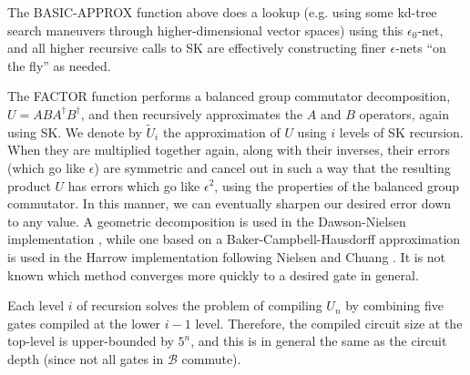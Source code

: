 The BASIC-APPROX function above does a lookup (e.g. using some kd-tree search
maneuvers through higher-dimensional vector spaces) using this $\epsilon_0$-net,
and all higher recursive calls to SK are effectively constructing
finer $\epsilon$-nets ``on the fly'' as needed.

The FACTOR function performs a balanced group commutator decomposition,
$U = ABA^\dagger B^\dagger$, and then recursively approximates the $A$ and $B$
operators, again using SK. We denote by $\tilde{U}_i$ the approximation
of $U$ using $i$ levels of SK recursion. When they are multiplied
together again, along with their inverses, their errors (which go like
$\epsilon$) are symmetric and cancel out in such a way that the resulting
product $U$ has errors which go like $\epsilon^2$, using the properties of
the balanced group commutator. In this manner, we can
eventually sharpen our desired error down to any value. A
geometric decomposition is used in the Dawson-Nielsen implementation \cite{Dawson2005},
while one based on a Baker-Campbell-Hausdorff approximation is used in the
Harrow implementation \cite{Harrow2001} following
Nielsen and Chuang \cite{Nielsen2000}. It is not
known which method converges more quickly to a desired gate in general.


Each level $i$ of recursion solves the problem of compiling 
$U_n$ by combining five gates compiled at the lower $i-1$ level.
Therefore, the compiled circuit size at the top-level is upper-bounded by $5^n$,
and
this is in general the same as the circuit depth (since not all gates in
$\mathcal{B}$ commute).

